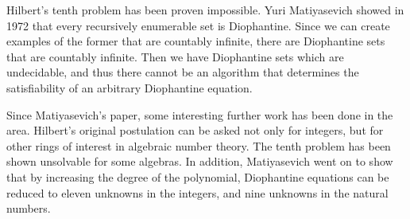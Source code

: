 \documentclass[12pt]{amsart}
\theoremstyle{case}
\begin{document}
	Hilbert's tenth problem has been proven impossible. Yuri Matiyasevich showed in 1972 that every recursively enumerable set is Diophantine. Since we can create examples of the former that are countably infinite, there are Diophantine sets that are countably infinite. Then we have Diophantine sets which are undecidable, and thus there cannot be an algorithm that determines the satisfiability of an arbitrary Diophantine equation.
	
	Since Matiyasevich's paper, some interesting further work has been done in the area. Hilbert's original postulation can be asked not only for integers, but for other rings of interest in algebraic number theory. The tenth problem has been shown unsolvable for some algebras. In addition, Matiyasevich went on to show that by increasing the degree of the polynomial, Diophantine equations can be reduced to eleven unknowns in the integers, and nine unknowns in the natural numbers.
	
	
	
	
\end{document}
